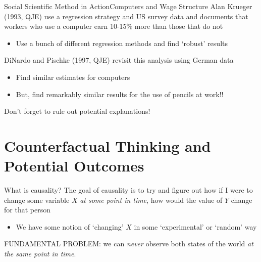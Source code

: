 \documentclass[aspectratio=169,t,11pt,table]{beamer}
\begin{document}
\begin{frame}{Social Scientific Method in Action}{Computers and Wage Structure}
  Alan Krueger (1993, QJE) use a regression strategy and US survey data and documents that workers who use a computer earn 10-15\% more than those that do not
  \begin{itemize}
    \item Use a bunch of different regression methods and find `robust' results
  \end{itemize}

  \bigskip
  \pause
  DiNardo and Pischke (1997, QJE) revisit this analysis using German data
  \begin{itemize}
    \item Find similar estimates for computers
    
    \item But, find remarkably similar results for the use of pencils at work!!
  \end{itemize}

  \bigskip
  Don't forget to rule out potential explanations!
\end{frame}

% 



% 



\section{Counterfactual Thinking and Potential Outcomes}

\begin{frame}{What is causality?}
  The goal of \alert{causality} is to try and figure out how if I were to change some variable $X$ \emph{at some point in time}, how would the value of $Y$ change for that person
  \begin{itemize}
    \item We have some notion of `changing' $X$ in some `experimental' or `random' way
  \end{itemize}

  \pause
  \bigskip
  \alert{FUNDAMENTAL PROBLEM:} we can \emph{never} observe both states of the world \emph{at the same point in time}.
\end{frame}
\end{document}
